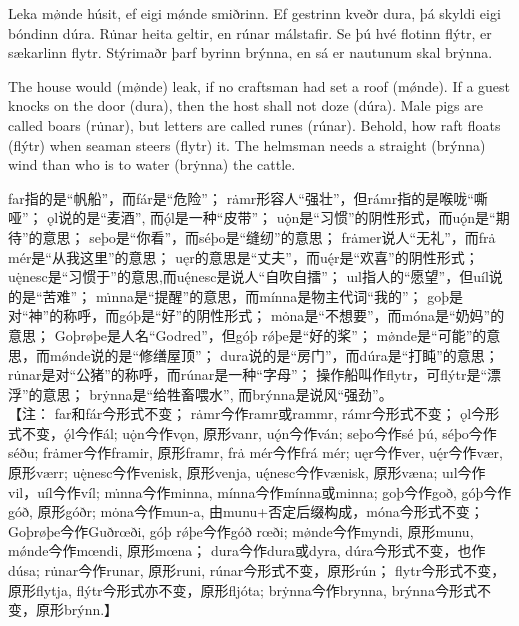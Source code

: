 \begin{paracol}{2}
    \switchcolumn*
    Leka mø̇nde húsit, ef eigi mǿnde smiðrinn. Ef gestrinn kveðr dura, þá skyldi eigi bóndinn dúra. Ru̇nar heita geltir, en rúnar málstafir. Se þú hvé flotinn flýtr, er sækarlinn flytr. Stýrimaðr þarf byrinn brýnna, en sá er nautunum skal brẏnna.

    \switchcolumn
    The house would (mø̇nde) leak, if no craftsman had set a roof (mǿnde). If a guest knocks on the door (dura), then the host shall not doze (dúra). Male pigs are called boars (ru̇nar), but letters are called runes (rúnar). Behold, how raft floats (flýtr) when seaman steers (flytr) it. The helmsman needs a straight (brýnna) wind than who is to water (brẏnna) the cattle.
\end{paracol}
\begin{translation*}{}
    far指的是“帆船”，而fár是“危险”；
    r\.{a}mr形容人“强壮”，但rámr指的是喉咙“嘶哑”；
    ǫl说的是“麦酒”, 而ǫ́l是一种“皮带”；
    u\.{ǫ}n是“习惯”的阴性形式，而uǫ́n是“期待”的意思；
    seþo是“你看”，而séþo是“缝纫”的意思；
    fr\.{a}mer说人“无礼”，而frȧ mér是“从我这里”的意思；
    uęr的意思是“丈夫”，而uę́r是“欢喜”的阴性形式；
    u\.{ę}nesc是“习惯于”的意思,而uę́nesc是说人“自吹自擂”；
    uıl指人的“愿望”，但uíl说的是“苦难”；
    m\.{ı}nna是“提醒”的意思，而mínna是物主代词“我的”；
    goþ是对“神”的称呼，而góþ是“好”的阴性形式；
    mȯna是“不想要”，而móna是“奶妈”的意思；
    Goþrøþe是人名“Godred”，但góþ rǿþe是“好的桨”；
    m\.{ø}nde是“可能”的意思，而mǿnde说的是“修缮屋顶”；
    dura说的是“房门”，而dúra是“打盹”的意思；
    r\.{u}nar是对“公猪”的称呼，而rúnar是一种“字母”；
    操作船叫作flytr，可flýtr是“漂浮”的意思；
    br\.{y}nna是“给牲畜喂水”, 而brýnna是说风“强劲”。\\

    【注：
    far和fár今形式不变；
    r\.{a}mr今作ramr或rammr, rámr今形式不变；
    ǫl今形式不变，ǫ́l今作ál;
    u\.{ǫ}n今作vǫn, 原形vanr, u\'{ǫ}n今作ván; seþo今作sé þú, séþo今作séðu;
    fr\.{a}mer今作framir, 原形framr, frȧ mér今作frá mér;
    uęr今作ver, u\'{ę}r今作vær, 原形værr;
    u\.{ę}nesc今作venisk, 原形venja, u\'{ę}nesc今作vænisk, 原形væna;
    uıl今作vil，uíl今作víl;
    m\.{ı}nna今作minna, mínna今作mínna或minna;
    goþ今作goð, góþ今作góð, 原形góðr;
    mȯna今作mun-a, 由munu+否定后缀构成，móna今形式不变；
    Goþrøþe今作Guðrœði, góþ rǿþe今作góð rœði;
    m\.{ø}nde今作myndi, 原形munu, mǿnde今作mœndi, 原形mœna；
    dura今作dura或dyra, dúra今形式不变，也作dúsa;
    r\.{u}nar今作runar, 原形runi, rúnar今形式不变，原形rún；
    flytr今形式不变，原形flytja, flýtr今形式亦不变，原形fljóta;
    br\.{y}nna今作brynna, brýnna今形式不变，原形brýnn.】
\end{translation*}
